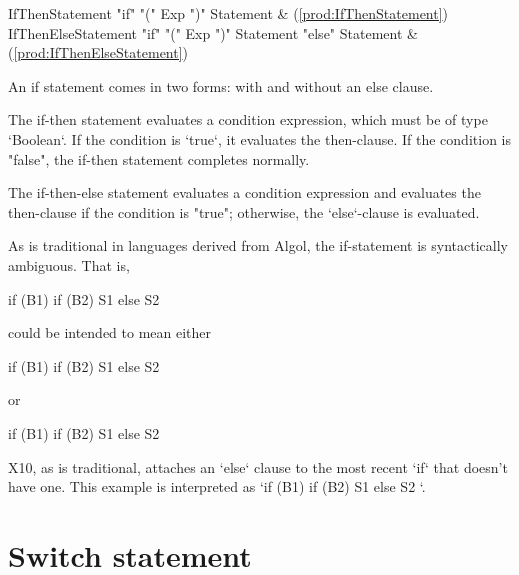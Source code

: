 \begin{bbgrammar}
 IfThenStatement    \: \xcd"if" \xcd"(" Exp \xcd")" Statement & (\ref{prod:IfThenStatement})\\%
 IfThenElseStatement    \: \xcd"if" \xcd"(" Exp \xcd")" Statement  \xcd"else" Statement  & (\ref{prod:IfThenElseStatement})\\%
\end{bbgrammar}

An if statement comes in two forms: with and without an else
clause.

The if-then statement evaluates a condition expression, which must be of type
\xcd`Boolean`. If the condition is \xcd`true`, it evaluates the then-clause.
If the condition is \xcd"false", the if-then statement completes normally.

The if-then-else statement evaluates a condition expression and 
evaluates the then-clause if the condition is
\xcd"true"; otherwise, the \xcd`else`-clause is evaluated.

As is traditional in languages derived from Algol, the if-statement is syntactically
ambiguous.  That is, 
\begin{xten}
if (B1) if (B2) S1 else S2
\end{xten}
could be intended to mean either 
\begin{xten}
if (B1) { if (B2) S1 else S2 }
\end{xten} 
or 
\begin{xten}
if (B1) {if (B2) S1} else S2
\end{xten}
X10, as is traditional, attaches an \xcd`else` clause to the most recent
\xcd`if` that doesn't have one.
This example is interpreted as 
\xcd`if (B1) { if (B2) S1 else S2 }`. 



\section{Switch statement}

